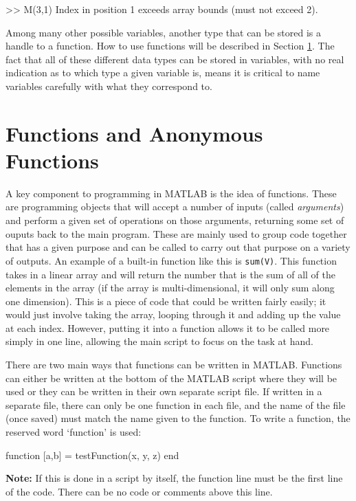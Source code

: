\begin{matlab}
>> M(3,1) 
Index in position 1 exceeds array bounds (must not exceed 2).
\end{matlab}

Among many other possible variables, another type that can be stored is a handle to a function. How to use functions will be described in Section \ref{funMat:section}. The fact that all of these different data types can be stored in variables, with no real indication as to which type a given variable is, means it is critical to name variables carefully with what they correspond to. 

\section{Functions and Anonymous Functions} \label{funMat:section}

A key component to programming in MATLAB is the idea of functions. These are programming objects that will accept a number of inputs (called \emph{arguments}) and perform a given set of operations on those arguments, returning some set of ouputs back to the main program. These are mainly used to group code together that has a given purpose and can be called to carry out that purpose on a variety of outputs. An example of a built-in function like this is \texttt{sum(V)}. This function takes in a linear array and will return the number that is the sum of all of the elements in the array (if the array is multi-dimensional, it will only sum along one dimension). This is a piece of code that could be written fairly easily; it would just involve taking the array, looping through it and adding up the value at each index. However, putting it into a function allows it to be called more simply in one line, allowing the main script to focus on the task at hand. 

There are two main ways that functions can be written in MATLAB. Functions can either be written at the bottom of the MATLAB script where they will be used or they can be written in their own separate script file. If written in a separate file, there can only be one function in each file, and the name of the file (once saved) must match the name given to the function. To write a function, the reserved word `function' is used:
\begin{matlab}
function [a,b] = testFunction(x, y, z)
end
\end{matlab}

\textbf{Note:} If this is done in a script by itself, the function line must be the first line of the code. There can be no code or comments above this line.

